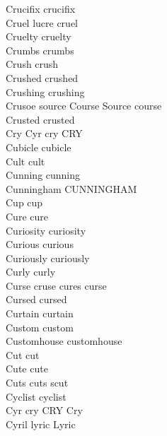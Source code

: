Crucifix crucifix\\
Cruel lucre cruel\\
Cruelty cruelty\\
Crumbs crumbs\\
Crush crush\\
Crushed crushed\\
Crushing crushing\\
Crusoe source Course Source course\\
Crusted crusted\\
Cry Cyr cry CRY\\
Cubicle cubicle\\
Cult cult\\
Cunning cunning\\
Cunningham CUNNINGHAM\\
Cup cup\\
Cure cure\\
Curiosity curiosity\\
Curious curious\\
Curiously curiously\\
Curly curly\\
Curse cruse cures curse\\
Cursed cursed\\
Curtain curtain\\
Custom custom\\
Customhouse customhouse\\
Cut cut\\
Cute cute\\
Cuts cuts scut\\
Cyclist cyclist\\
Cyr cry CRY Cry\\
Cyril lyric Lyric\\

